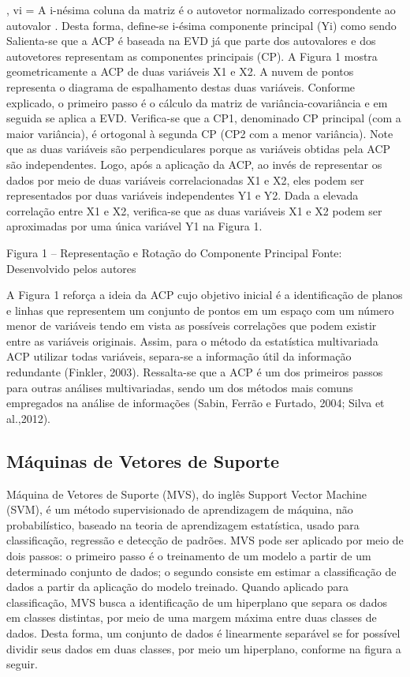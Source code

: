 ,
vi = 
A i-nésima coluna da matriz  é o autovetor normalizado  correspondente ao autovalor . Desta forma, define-se i-ésima componente principal (Yi) como sendo
Salienta-se que a ACP é baseada na EVD já que parte dos autovalores e dos autovetores representam as componentes principais (CP). 
A Figura 1 mostra geometricamente a ACP de duas variáveis X1 e X2. A nuvem de pontos representa o diagrama de espalhamento destas duas variáveis. Conforme explicado, o primeiro passo é o cálculo da matriz de variância-covariância e em seguida se aplica a EVD. Verifica-se que a CP1, denominado CP principal (com a maior variância), é ortogonal à segunda CP (CP2 com a menor variância). Note que as duas variáveis são perpendiculares porque as variáveis obtidas pela ACP são independentes. Logo, após a aplicação da ACP, ao invés de representar os dados por meio de duas variáveis correlacionadas X1 e X2, eles podem ser representados por duas variáveis independentes Y1 e Y2. Dada a elevada correlação entre X1 e X2, verifica-se que as duas variáveis X1 e X2 podem ser aproximadas por uma única variável Y1 na Figura 1.

Figura 1 – Representação e Rotação do Componente Principal
Fonte: Desenvolvido pelos autores

A Figura 1 reforça a ideia da ACP cujo objetivo inicial é a identificação de planos e linhas que representem um conjunto de pontos em um espaço com um número menor de variáveis tendo em vista as possíveis correlações que podem existir entre as variáveis originais.
Assim, para o método da estatística multivariada ACP utilizar todas variáveis, separa-se a informação útil da informação redundante (Finkler, 2003). Ressalta-se que a ACP é um dos primeiros passos para outras análises multivariadas, sendo um dos métodos mais comuns empregados na análise de informações (Sabin, Ferrão e Furtado, 2004; Silva et al.,2012).

\subsection{Máquinas de Vetores de Suporte}

Máquina de Vetores de Suporte (MVS), do inglês Support Vector Machine (SVM), é um método supervisionado de aprendizagem de máquina, não probabilístico, baseado na teoria de aprendizagem estatística, usado para classificação, regressão e detecção de padrões. MVS pode ser aplicado por meio de dois passos: o primeiro passo é o treinamento de um modelo a partir de um determinado conjunto de dados; o segundo consiste em estimar a classificação de dados a partir da aplicação do modelo treinado. 
Quando aplicado para classificação, MVS busca a identificação de um hiperplano que separa os dados em classes distintas, por meio de uma margem máxima entre duas classes de dados. Desta forma, um conjunto de dados é linearmente separável se for possível dividir seus dados em duas classes, por meio um hiperplano, conforme na figura a seguir. 

